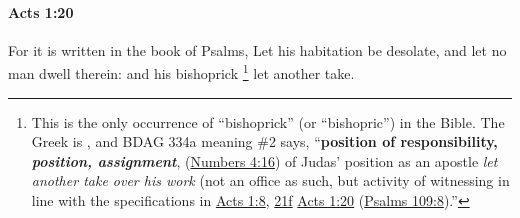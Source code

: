 			\begin{framed}
			\scriptsize
				\begin{compactdesc}
					\item[SBLG] 
				\end{compactdesc}
			\end{framed}

		\paragraph{Acts 1:20} %
			\label{ACTS-1-20}

			For it is written in the book of Psalms, Let his habitation be desolate, and let no man dwell therein: and his bishoprick%
				\footnote{%
					This is the only occurrence of ``bishoprick'' (or ``bishopric'') in the Bible. The Greek is , and BDAG 334a meaning \#2 says, ``\textbf{position of responsibility, \textit{position, assignment}}, (\hyperref[NUMBERS-4-16]{Numbers 4:16}) of Judas' position as an apostle  \textit{let another take over his work} (not an office as such, but activity of witnessing in line with the specifications in \hyperref[ACTS-1-8]{Acts 1:8}, \hyperref[ACTS-1-21]{21f} \hyperref[ACTS-1-20]{Acts 1:20} (\hyperref[PSALMS-109-8]{Psalms 109:8}).''
					}
			let another take.

